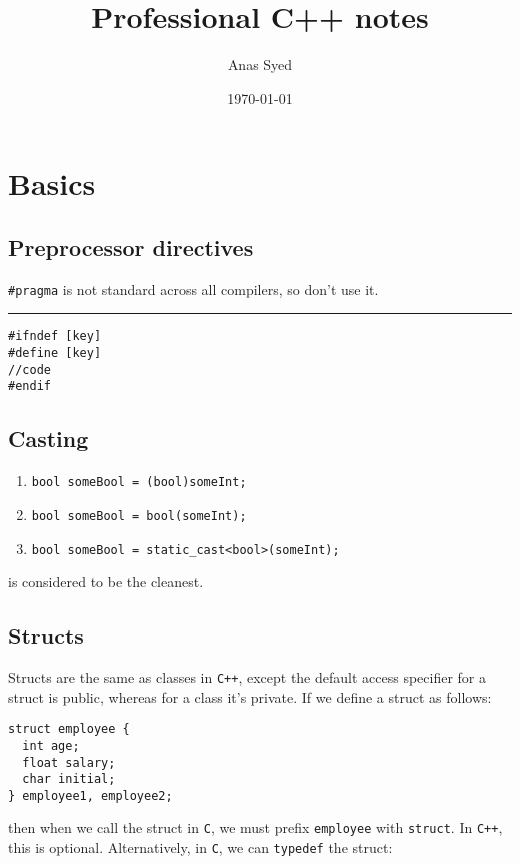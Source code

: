 \documentclass[a4paper,12pt]{article}
\title{Professional C++ notes}
\date{\today}
\author{Anas Syed}
\newcommand*{\hlinebreak}{\rule{\textwidth}{1pt}}
\begin{document}
\maketitle
\tableofcontents
\newcommand{\sectionbreak}{\clearpage}

\section{Basics}
\subsection{Preprocessor directives}

\lstinline|#pragma| is not standard across all compilers, so don't use it.

\hlinebreak
\begin{lstlisting}[caption={Prevent circular includes}]
#ifndef [key]
#define [key]
//code
#endif
\end{lstlisting}

\subsection{Casting}
\begin{enumerate}
  \item \lstinline|bool someBool = (bool)someInt;|
  \item \lstinline|bool someBool = bool(someInt);|
  \item \label{itm:static_cast} \lstinline|bool someBool = static_cast<bool>(someInt);|
\end{enumerate}
 is considered to be the cleanest.

\subsection{Structs}
Structs are the same as classes in \verb|C++|, except the default access specifier for a struct is public, whereas for a class it's private. If we define a struct as follows:

\begin{lstlisting}
struct employee {
  int age;
  float salary;
  char initial;
} employee1, employee2;
\end{lstlisting}

then when we call the struct in \verb|C|, we must prefix \verb|employee| with \verb|struct|. In \verb|C++|, this is optional. Alternatively, in \verb|C|, we can \verb|typedef| the struct:
\end{document}
